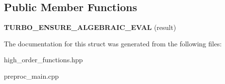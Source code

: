 \subsection*{Public Member Functions}
\begin{DoxyCompactItemize}
\item 
\hypertarget{structtml_1_1impl_1_1filter__impl_3_01F_00_01BEGIN_00_01END_00_01tml_1_1list_3_01PASSED_8_8_8_4_01_4_aa5e3019a20b50d7caba3f86e0105a6ac}{{\bfseries T\+U\+R\+B\+O\+\_\+\+E\+N\+S\+U\+R\+E\+\_\+\+A\+L\+G\+E\+B\+R\+A\+I\+C\+\_\+\+E\+V\+A\+L} (result)}\label{structtml_1_1impl_1_1filter__impl_3_01F_00_01BEGIN_00_01END_00_01tml_1_1list_3_01PASSED_8_8_8_4_01_4_aa5e3019a20b50d7caba3f86e0105a6ac}

\end{DoxyCompactItemize}


The documentation for this struct was generated from the following files\+:\begin{DoxyCompactItemize}
\item 
high\+\_\+order\+\_\+functions.\+hpp\item 
preproc\+\_\+main.\+cpp\end{DoxyCompactItemize}
